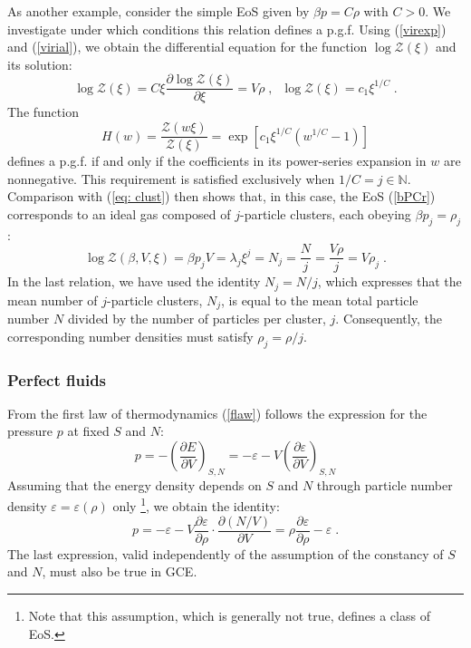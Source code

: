 \documentclass[a4paper,12pt]{amsart}
\theoremstyle{definition}
\theoremstyle{remark}
\begin{document}
As another example, consider the simple EoS given by $\beta p = C\rho$ with $C>0$. We investigate under which conditions this relation defines a p.g.f. Using (\ref{virexp}) and (\ref{virial}), we obtain the differential equation for the function $\log \mathcal{Z}(\xi)$ and its solution:
\begin{equation}\label{bPCr}
\log \mathcal{Z}(\xi)= C \xi\frac{\partial\log \mathcal{Z}(\xi)}{\partial \xi} = V\rho\;,\;\;  \log \mathcal{Z}(\xi) = c_1 \xi^{1/C}\;.
\end{equation}
The function
\begin{equation}\label{PoisC}
H(w)=\frac{\mathcal{Z}(w\xi)}{\mathcal{Z}(\xi)}=\exp\left[c_1 \xi^{1/C}(w^{1/C}-1)\right]
\end{equation}
defines a p.g.f. if and only if the coefficients in its power-series expansion in $w$ are nonnegative. This requirement is satisfied exclusively when $1/C = j \in \mathbb{N}$. Comparison with (\ref{eq: clust}) then shows that, in this case, the EoS (\ref{bPCr}) corresponds to an ideal gas composed of $j$-particle clusters, each obeying $\beta p_j = \rho_j$:
\begin{equation}\label{EoSj}
 \log \mathcal{Z}(\beta, V,\xi) =   
\beta p_jV  = \lambda_j \xi^j = N_j = \frac{N}{j} = \frac{V
\rho}{j} = V\rho_j\;.
\end{equation}
In the last relation, we have used the identity $N_j = N/j$, which expresses that the mean number of $j$-particle clusters, $N_j$, is equal to the mean total particle number $N$ divided by the number of particles per cluster, $j$. Consequently, the corresponding number densities must satisfy $\rho_j = \rho/j$.

\subsubsection{Perfect fluids} 
  From the first law of thermodynamics (\ref{flaw}) follows the expression for the pressure $p$  at fixed $S$ and $N$:
\[
p=-\left(\frac{\partial E}{\partial V}\right)_{S,N}=
-\varepsilon - V\left(\frac{\partial \varepsilon}{\partial V}\right)_{S,N}
\]
Assuming that the energy density depends on $S$ and $N$ through particle number density $\varepsilon=\varepsilon(\rho)$ only \footnote{Note that this assumption, which is generally not true, defines a class of EoS.}, we obtain the identity:
\begin{equation}\label{p_rho_eps}
p=
-\varepsilon - V \frac{\partial \varepsilon}{\partial\rho}\cdot\frac{\partial (N/V)}{\partial V}=
\rho \frac{\partial\varepsilon}{\partial\rho}-\varepsilon\;.
\end{equation}
The last expression, valid independently of the assumption of the constancy of $S$ and $N$, must also be true in GCE.  
\end{document}

